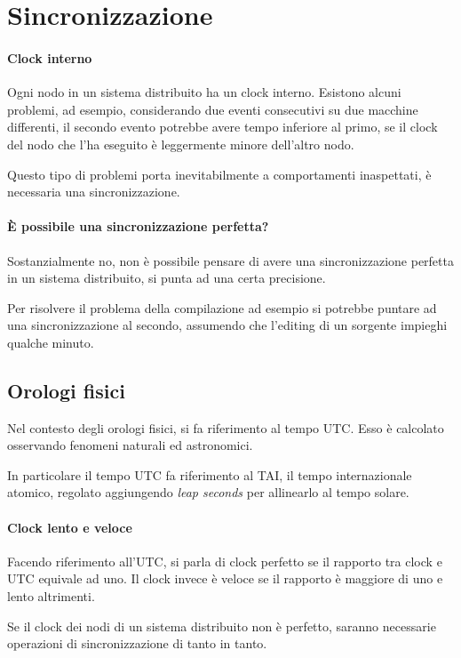 \section{Sincronizzazione}

\paragraph{Clock interno}
Ogni nodo in un sistema distribuito ha un clock interno. 
Esistono alcuni problemi, ad esempio, considerando due eventi 
consecutivi su due macchine differenti, il secondo 
evento potrebbe avere tempo inferiore al primo, 
se il clock del nodo che l'ha eseguito è leggermente minore dell'altro nodo.

Questo tipo di problemi porta inevitabilmente a comportamenti 
inaspettati, è necessaria una sincronizzazione.
 
\paragraph{È possibile una sincronizzazione perfetta?}
Sostanzialmente no, non è possibile pensare di avere una 
sincronizzazione perfetta in un sistema distribuito, 
si punta ad una certa precisione. 

Per risolvere il problema 
della compilazione ad esempio si potrebbe puntare ad una sincronizzazione al 
secondo, assumendo che l'editing di un sorgente impieghi 
qualche minuto.

\subsection{Orologi fisici}

Nel contesto degli orologi fisici, si fa riferimento al 
tempo UTC. Esso è calcolato osservando fenomeni naturali ed
astronomici.
 
In particolare il tempo UTC fa riferimento al 
TAI, il tempo internazionale atomico, regolato 
aggiungendo \emph{leap seconds} per allinearlo al tempo 
solare.

\paragraph{Clock lento e veloce}
Facendo riferimento all'UTC, si parla di clock perfetto 
se il rapporto tra clock e UTC equivale ad uno.
Il clock invece è veloce se il rapporto è maggiore 
di uno e lento altrimenti.

Se il clock dei nodi di un sistema distribuito non è perfetto, 
saranno necessarie operazioni di sincronizzazione di tanto 
in tanto.

